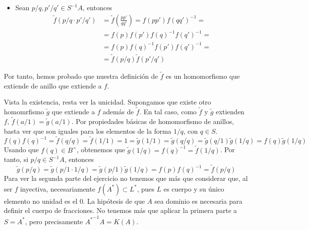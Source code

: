 \documentclass[twoside]{article}
\begin{document}
\begin{ejercicio}{1}
\begin{solucion}
\begin{itemize}
\begin{itemize}
\item Sean $p/q,p'/q' \in S^{-1}A$, entonces
\begin{align*}
\tilde{f}(p/q\cdot p'/q') &= 	\tilde{f}\left(\frac{pp'}{qq'}\right) = f(pp')f(qq')^{-1} = \\
 &= f(p)f(p')f(q)^{-1}f(q')^{-1} = \\
 &= f(p)f(q)^{-1}f(p')f(q')^{-1} =\\
 &= \tilde{f}(p/q)\tilde{f}(p'/q')
\end{align*}
\end{itemize}
Por tanto, hemos probado que nuestra definición de $\tilde{f}$ es un homomorfismo que extiende de anillo que extiende a $f$.
\end{itemize}
Vista la existencia, resta ver la unicidad. Supongamos que existe otro homomrfismo $\tilde{g}$ que extiende a $f$ además de $\tilde{f}$. En tal caso, como $\tilde{f}$ y $\tilde{g}$ extienden $f$, $\tilde{f}(a/1)=\tilde{g}(a/1)$. Por propiedades básicas de homomorfismo de anillos, basta ver que son iguales para los elementos de la forma $1/q$, con $q\in S$.
$$
f(q)f(q)^{-1} = \tilde{f}(q/q)= \tilde{f}(1/1) = 1 =\tilde{g}(1/1) =\tilde{g}(q/q) =\tilde{g}(q/1)\tilde{g}(1/q)=f(q)\tilde{g}(1/q)
$$
Usando que $f(q)\in B^\times$, obtenemos que $\tilde{g}(1/q)=f(q)^{-1}=\tilde{f}(1/q)$. Por tanto, si ${p/q\in S^{-1}A}$, entonces 
$$
\tilde{g}(p/q) = \tilde{g}(p/1\cdot 1/q) = \tilde{g}(p/1)\tilde{g}(1/q) = f(p)f(q)^{-1} = \tilde{f}(p/q)
$$
Para ver la segunda parte del ejercicio no tenemos que más que considerar que, al ser $f$ inyectiva, necesariamente $f(A^*)\subset L^*$, pues $L$ es cuerpo y su único elemento no unidad es el $0$. La hipótesis de que $A$ sea dominio es necesaria para definir el cuerpo de fracciones. No tenemos más que aplicar la primera parte a $S=A^{*}$, pero precisamente ${A^*}^{-1}A = K(A)$. 
\end{solucion}
\end{ejercicio}
\end{document}
